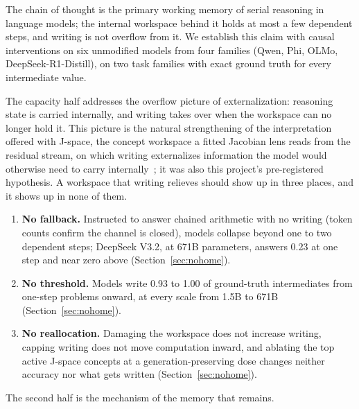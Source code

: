 \documentclass{article}
\begin{document}
The chain of thought is the primary working memory of serial reasoning in language models; the internal workspace behind it holds at most a few dependent steps, and writing is not overflow from it. We establish this claim with causal interventions on six unmodified models from four families (Qwen, Phi, OLMo, DeepSeek-R1-Distill), on two task families with exact ground truth for every intermediate value.

The capacity half addresses the overflow picture of externalization: reasoning state is carried internally, and writing takes over when the workspace can no longer hold it. This picture is the natural strengthening of the interpretation offered with J-space, the concept workspace a fitted Jacobian lens reads from the residual stream, on which writing externalizes information the model would otherwise need to carry internally~\citep{gurnee2026jspace}; it was also this project's pre-registered hypothesis. A workspace that writing relieves should show up in three places, and it shows up in none of them.

\begin{enumerate}
\item \textbf{No fallback.} Instructed to answer chained arithmetic with no writing (token counts confirm the channel is closed), models collapse beyond one to two dependent steps; DeepSeek V3.2, at 671B parameters, answers 0.23 at one step and near zero above (Section~\ref{sec:nohome}).
\item \textbf{No threshold.} Models write 0.93 to 1.00 of ground-truth intermediates from one-step problems onward, at every scale from 1.5B to 671B (Section~\ref{sec:nohome}).
\item \textbf{No reallocation.} Damaging the workspace does not increase writing, capping writing does not move computation inward, and ablating the top active J-space concepts at a generation-preserving dose changes neither accuracy nor what gets written (Section~\ref{sec:nohome}).
\end{enumerate}

The second half is the mechanism of the memory that remains.
\end{document}
